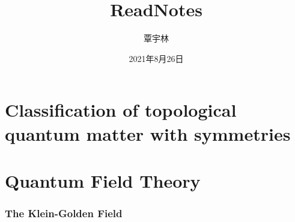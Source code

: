








\setlength{\droptitle}{-2cm}
\pretitle{\begin{center}\LARGE\sffamily}
\title{ReadNotes}
\posttitle{\par\end{center}\vspace{-0.3cm}}
\preauthor{\large}
\DeclareRobustCommand{\authorthing}
{
\begin{center}
\begin{tabular}{c}%
覃宇林\\
\end{tabular}
\end{center}
}
\author{\authorthing}
\postauthor{}
\predate{\begin{center}\large\scshape}
\date{2021年8月26日}
\postdate{\par\end{center}}


\frontpagestyle
\maketitle
{}
\tableofcontents\newpage
{}
\mainpagestyle
\setcounter{page}{1}

\part{Classification of topological quantum matter with symmetries}

\clearpage

\part{Quantum Field Theory}
\setcounter{section}{0}
\section{The Klein-Golden Field}


